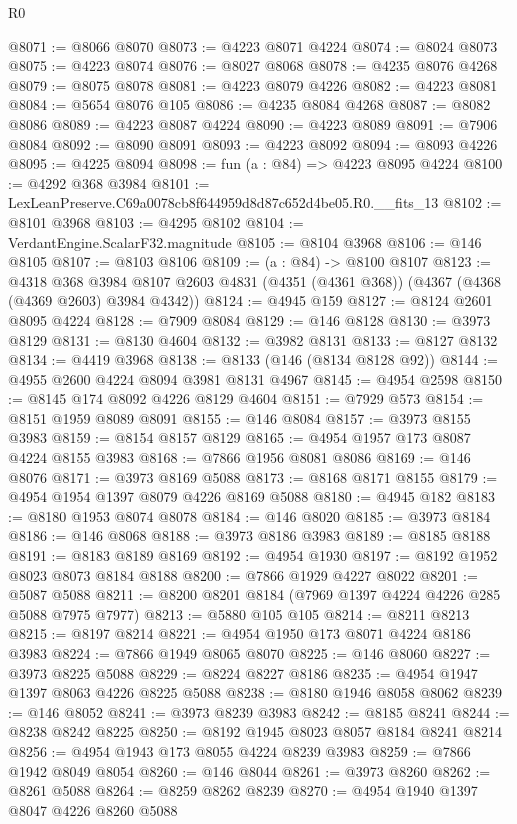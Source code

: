 \begin{lexlean}{R0}
\begin{coremodule}
@8071 := @8066 @8070
@8073 := @4223 @8071 @4224
@8074 := @8024 @8073
@8075 := @4223 @8074
@8076 := @8027 @8068
@8078 := @4235 @8076 @4268
@8079 := @8075 @8078
@8081 := @4223 @8079 @4226
@8082 := @4223 @8081
@8084 := @5654 @8076 @105
@8086 := @4235 @8084 @4268
@8087 := @8082 @8086
@8089 := @4223 @8087 @4224
@8090 := @4223 @8089
@8091 := @7906 @8084
@8092 := @8090 @8091
@8093 := @4223 @8092
@8094 := @8093 @4226
@8095 := @4225 @8094
@8098 := fun (a : @84) => @4223 @8095 @4224
@8100 := @4292 @368 @3984
@8101 := LexLeanPreserve.C69a0078cb8f644959d8d87c652d4be05.R0.__fits_13
@8102 := @8101 @3968
@8103 := @4295 @8102
@8104 := VerdantEngine.ScalarF32.magnitude
@8105 := @8104 @3968
@8106 := @146 @8105
@8107 := @8103 @8106
@8109 := (a : @84) -> @8100 @8107
@8123 := @4318
    @368
    @3984
    @8107
    @2603
    @4831
    (@4351 (@4361 @368))
    (@4367 (@4368 (@4369 @2603) @3984 @4342))
@8124 := @4945 @159
@8127 := @8124 @2601 @8095 @4224
@8128 := @7909 @8084
@8129 := @146 @8128
@8130 := @3973 @8129
@8131 := @8130 @4604
@8132 := @3982 @8131
@8133 := @8127 @8132
@8134 := @4419 @3968
@8138 := @8133 (@146 (@8134 @8128 @92))
@8144 := @4955 @2600 @4224 @8094 @3981 @8131 @4967
@8145 := @4954 @2598
@8150 := @8145 @174 @8092 @4226 @8129 @4604
@8151 := @7929 @573
@8154 := @8151 @1959 @8089 @8091
@8155 := @146 @8084
@8157 := @3973 @8155 @3983
@8159 := @8154 @8157 @8129
@8165 := @4954 @1957 @173 @8087 @4224 @8155 @3983
@8168 := @7866 @1956 @8081 @8086
@8169 := @146 @8076
@8171 := @3973 @8169 @5088
@8173 := @8168 @8171 @8155
@8179 := @4954 @1954 @1397 @8079 @4226 @8169 @5088
@8180 := @4945 @182
@8183 := @8180 @1953 @8074 @8078
@8184 := @146 @8020
@8185 := @3973 @8184
@8186 := @146 @8068
@8188 := @3973 @8186 @3983
@8189 := @8185 @8188
@8191 := @8183 @8189 @8169
@8192 := @4954 @1930
@8197 := @8192 @1952 @8023 @8073 @8184 @8188
@8200 := @7866 @1929 @4227 @8022
@8201 := @5087 @5088
@8211 := @8200 @8201 @8184 (@7969 @1397 @4224 @4226 @285 @5088 @7975 @7977)
@8213 := @5880 @105 @105
@8214 := @8211 @8213
@8215 := @8197 @8214
@8221 := @4954 @1950 @173 @8071 @4224 @8186 @3983
@8224 := @7866 @1949 @8065 @8070
@8225 := @146 @8060
@8227 := @3973 @8225 @5088
@8229 := @8224 @8227 @8186
@8235 := @4954 @1947 @1397 @8063 @4226 @8225 @5088
@8238 := @8180 @1946 @8058 @8062
@8239 := @146 @8052
@8241 := @3973 @8239 @3983
@8242 := @8185 @8241
@8244 := @8238 @8242 @8225
@8250 := @8192 @1945 @8023 @8057 @8184 @8241 @8214
@8256 := @4954 @1943 @173 @8055 @4224 @8239 @3983
@8259 := @7866 @1942 @8049 @8054
@8260 := @146 @8044
@8261 := @3973 @8260
@8262 := @8261 @5088
@8264 := @8259 @8262 @8239
@8270 := @4954 @1940 @1397 @8047 @4226 @8260 @5088

\end{coremodule}
\end{lexlean}
